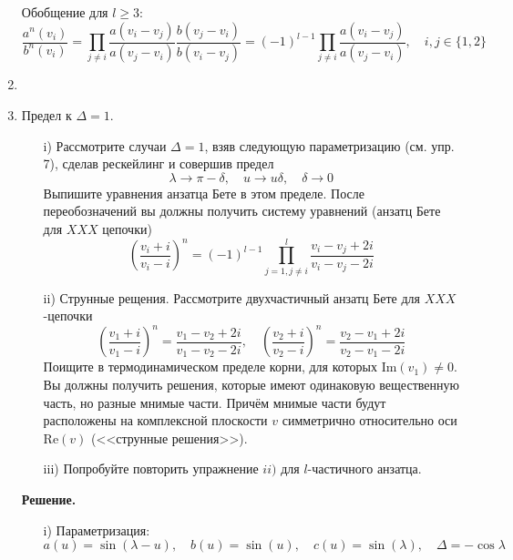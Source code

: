 \documentclass[12pt]{article}
\theoremstyle{definition}
\begin{document}
\begin{enumerate}
    Обобщение для $l\geq3$:
    \begin{equation}
        \frac{a^n(v_i)}{b^n(v_i)}=\prod\limits_{j\neq i}\frac{a(v_i-v_j)}{a(v_j-v_i)}\frac{b(v_j-v_i)}{b(v_i-v_j)}=(-1)^{l-1}\prod\limits_{j\neq i}\frac{a(v_i-v_j)}{a(v_j-v_i)},\quad i,j\in\{1,2\}
    \end{equation}
    \item
    \item Предел к $\Delta=1$.
    \begin{itemize}
        \item[i)] Рассмотрите случаи $\Delta=1$, взяв следующую параметризацию (см. упр. 7), сделав рескейлинг и совершив предел
        \begin{equation}
            \lambda\rightarrow\pi-\delta, \quad u\rightarrow u\delta,\quad \delta\rightarrow0
        \end{equation}
        Выпишите уравнения анзатца Бете в этом пределе. После переобозначений вы должны получить систему уравнений (анзатц Бете для $XXX$ цепочки)
        \begin{equation}
            \left(\frac{v_i+i}{v_i-i}\right)^n=(-1)^{l-1}\prod\limits_{j=1,j\neq i}^l\frac{v_i-v_j+2i}{v_i-v_j-2i}
        \end{equation}
        \item[ii)] Струнные рещения. Рассмотрите двухчастичный анзатц Бете для $XXX$-цепочки
        \begin{equation}
            \left(\frac{v_1+i}{v_1-i}\right)^n=\frac{v_1-v_2+2i}{v_1-v_2-2i},\quad\left(\frac{v_2+i}{v_2-i}\right)^n=\frac{v_2-v_1+2i}{v_2-v_1-2i}
        \end{equation}
        Поищите в термодинамическом пределе корни, для которых $\text{Im}(v_1)\neq0$. Вы должны получить решения, которые имеют одинаковую вещественную часть, но разные мнимые части. Причём мнимые части будут расположены на комплексной плоскости $v$ симметрично относительно оси $\text{Re}(v)$ (<<струнные решения>>).
        \item[iii)] Попробуйте повторить упражнение $ii)$ для $l$-частичного анзатца.
    \end{itemize}
    \textbf{Решение.}
    \begin{itemize}
        \item[i)] Параметризация:
        \begin{equation}
            a(u)=\sin(\lambda-u),\quad b(u)=\sin(u),\quad c(u)=\sin(\lambda),\quad\Delta=-\cos\lambda
        \end{equation}

\end{itemize}
\end{enumerate}
\end{document}
